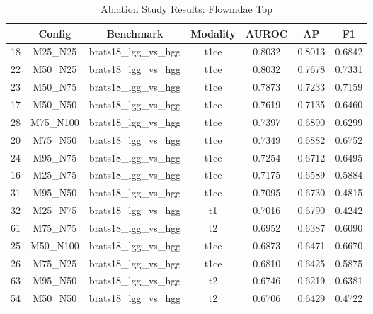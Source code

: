 \begin{table}[htbp]
\centering
\begin{table}
\caption{Ablation Study Results: Flowmdae Top}
\label{tab:flowmdae_top}
\begin{tabular}{lcccccc}
\toprule
\midrule
 & Config & Benchmark & Modality & AUROC & AP & F1 \\
\midrule
18 & M25_N25 & brats18_lgg_vs_hgg & t1ce & 0.8032 & 0.8013 & 0.6842 \\
22 & M50_N25 & brats18_lgg_vs_hgg & t1ce & 0.8032 & 0.7678 & 0.7331 \\
23 & M50_N75 & brats18_lgg_vs_hgg & t1ce & 0.7873 & 0.7233 & 0.7159 \\
17 & M50_N50 & brats18_lgg_vs_hgg & t1ce & 0.7619 & 0.7135 & 0.6460 \\
28 & M75_N100 & brats18_lgg_vs_hgg & t1ce & 0.7397 & 0.6890 & 0.6299 \\
20 & M75_N50 & brats18_lgg_vs_hgg & t1ce & 0.7349 & 0.6882 & 0.6752 \\
24 & M95_N75 & brats18_lgg_vs_hgg & t1ce & 0.7254 & 0.6712 & 0.6495 \\
16 & M25_N75 & brats18_lgg_vs_hgg & t1ce & 0.7175 & 0.6589 & 0.5884 \\
31 & M95_N50 & brats18_lgg_vs_hgg & t1ce & 0.7095 & 0.6730 & 0.4815 \\
32 & M25_N75 & brats18_lgg_vs_hgg & t1 & 0.7016 & 0.6790 & 0.4242 \\
61 & M75_N75 & brats18_lgg_vs_hgg & t2 & 0.6952 & 0.6387 & 0.6090 \\
25 & M50_N100 & brats18_lgg_vs_hgg & t1ce & 0.6873 & 0.6471 & 0.6670 \\
26 & M75_N25 & brats18_lgg_vs_hgg & t1ce & 0.6810 & 0.6425 & 0.5875 \\
63 & M95_N50 & brats18_lgg_vs_hgg & t2 & 0.6746 & 0.6219 & 0.6381 \\
54 & M50_N50 & brats18_lgg_vs_hgg & t2 & 0.6706 & 0.6429 & 0.4722 \\
\midrule
\bottomrule
\end{tabular}
\end{table}
\end{table}
